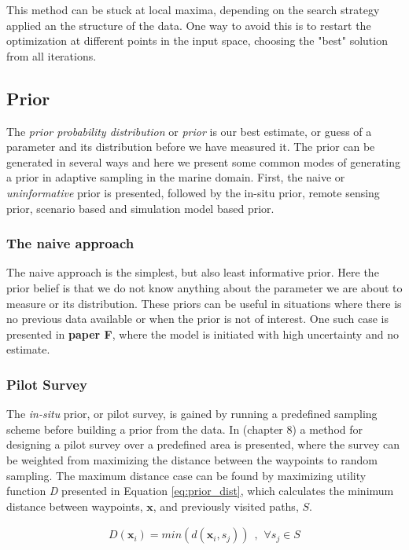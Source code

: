 This method can be stuck at local maxima, depending on the search strategy applied an the structure of the data. One way to avoid this is to restart the optimization at different points in the input space, choosing the "best" solution from all iterations. 


\subsection{Prior}
\label{sec:prior}

The \textit{prior probability distribution} or \textit{prior} is our best estimate, or guess of a parameter and its distribution before we have measured it. The prior can be generated in several ways and here we present some common modes of generating a prior in adaptive sampling in the marine domain. First, the naive or \textit{uninformative} \cite{gelman1995bayesian} prior is presented, followed by the in-situ prior, remote sensing prior, scenario based and simulation model based prior. 

\subsubsection{The naive approach}
The naive approach is the simplest, but also least informative prior. Here the prior belief is that we do not know anything about the parameter we are about to measure or its distribution. These priors can be useful in situations where there is no previous data available or when the prior is not of interest. One such case is presented in \textbf{paper F}, where the model is initiated with high uncertainty and no estimate. 

\subsubsection{Pilot Survey}
The \textit{in-situ} prior, or pilot survey, is gained by running a predefined sampling scheme before building a prior from the data. In \cite{kemna2018multi} (chapter 8) a method for designing a pilot survey over a predefined area is presented, where the survey can be weighted from maximizing the distance between the waypoints to random sampling. The maximum distance case can be found by maximizing utility function \textit{D} presented in Equation \ref{eq:prior_dist}, which calculates the minimum distance between waypoints, $\mathbf{x}$, and previously visited paths, $S$. 

\begin{align}
    \label{eq:prior_dist}
    D(\mathbf{x}_i) = min(d(\mathbf{x}_i,s_j))\hspace{5pt},\hspace{5pt} \forall s_j \in S
\end{align}

